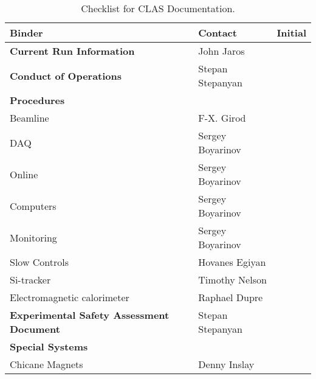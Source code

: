 \newpage

\begin{table}[p]
\caption{\label{table:doc} Checklist for CLAS Documentation.} 
\begin{center}
\begin{tabular}{|l|l|c|}    \hline
Binder & \hspace{1.0cm}Contact\hspace{1.0cm} & Initial \\ \hline
\bf{Current Run Information}                 & John Jaros & \\ \hline  
\bf{Conduct of Operations}                   & Stepan Stepanyan & \\ \hline 
\bf{Procedures}                              & & \\ \hline 
Beamline                                     & F-X. Girod & \\ 
DAQ                                          & Sergey Boyarinov  & \\ 
Online                                       & Sergey Boyarinov  & \\ 
Computers                                    & Sergey Boyarinov & \\ 
Monitoring                                   & Sergey Boyarinov & \\ 
Slow Controls                                & Hovanes Egiyan & \\ 
Si-tracker                               & Timothy Nelson & \\ 
Electromagnetic calorimeter                            & Raphael Dupre & \\ 
\bf{Experimental Safety Assessment Document} & Stepan Stepanyan & \\ \hline 
\bf{Special Systems}                         & & \\   \hline 
Chicane Magnets                                 & Denny Inslay  & \\ \hline 
\end{tabular}
\end{center}
\end{table}             
 

\newpage

